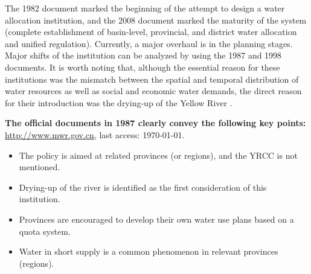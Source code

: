 \documentclass{article}
\begin{document}
The 1982 document marked the beginning of the attempt to design a water allocation institution, and the 2008 document marked the maturity of the system (complete establishment of basin-level, provincial, and district water allocation and unified regulation). Currently, a major overhaul is in the planning stages. Major shifts of the institution can be analyzed by using the 1987 and 1998 documents. It is worth noting that, although the essential reason for these institutions was the mismatch between the spatial and temporal distribution of water resources as well as social and economic water demands, the direct reason for their introduction was the drying-up of the Yellow River \cite{wangReviewImplementationYellow2019}.

\textbf{The official documents in 1987 clearly convey the following key points:}
\href{http://www.gov.cn/zhengce/content/2011-03/30/content_3138.htm#}{http://www.mwr.gov.cn}, last access: \today.
\begin{itemize}
	\item The policy is aimed at related provinces (or regions), and the YRCC is not mentioned.
	\item Drying-up of the river is identified as the first consideration of this institution.
	\item Provinces are encouraged to develop their own water use plans based on a quota system.
	\item Water in short supply is a common phenomenon in relevant provinces (regions).
\end{itemize}
\end{document}
